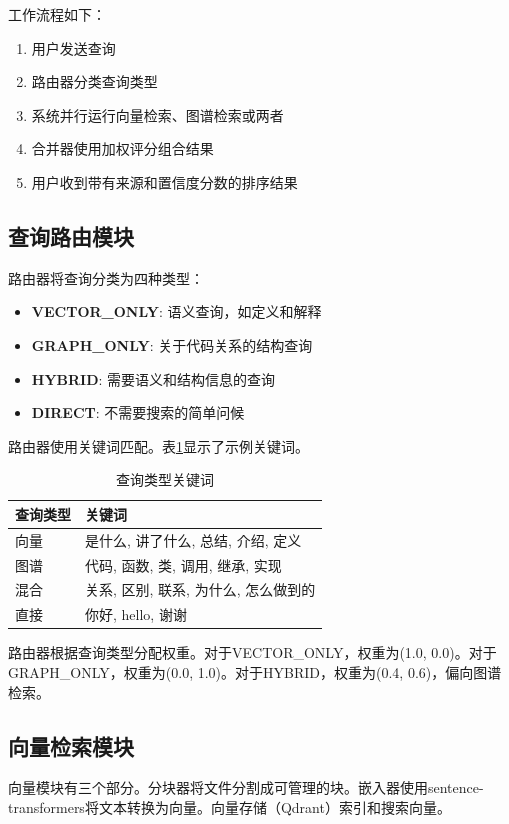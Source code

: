 \documentclass[11pt]{article}
\begin{document}
工作流程如下：

\begin{enumerate}
    \item 用户发送查询
    \item 路由器分类查询类型
    \item 系统并行运行向量检索、图谱检索或两者
    \item 合并器使用加权评分组合结果
    \item 用户收到带有来源和置信度分数的排序结果
\end{enumerate}

\subsection{查询路由模块}
路由器将查询分类为四种类型：

\begin{itemize}
    \item \textbf{VECTOR\_ONLY}: 语义查询，如定义和解释
    \item \textbf{GRAPH\_ONLY}: 关于代码关系的结构查询
    \item \textbf{HYBRID}: 需要语义和结构信息的查询
    \item \textbf{DIRECT}: 不需要搜索的简单问候
\end{itemize}

路由器使用关键词匹配。表\ref{tab:keywords}显示了示例关键词。

\begin{table}[htbp]
\centering
\caption{查询类型关键词}
\label{tab:keywords}
\begin{tabular}{ll}
\toprule
查询类型 & 关键词 \\
\midrule
向量 & 是什么, 讲了什么, 总结, 介绍, 定义 \\
图谱 & 代码, 函数, 类, 调用, 继承, 实现 \\
混合 & 关系, 区别, 联系, 为什么, 怎么做到的 \\
直接 & 你好, hello, 谢谢 \\
\bottomrule
\end{tabular}
\end{table}

路由器根据查询类型分配权重。对于VECTOR\_ONLY，权重为(1.0, 0.0)。对于GRAPH\_ONLY，权重为(0.0, 1.0)。对于HYBRID，权重为(0.4, 0.6)，偏向图谱检索。

\subsection{向量检索模块}
向量模块有三个部分。分块器将文件分割成可管理的块。嵌入器使用sentence-transformers将文本转换为向量。向量存储（Qdrant）索引和搜索向量。
\end{document}
